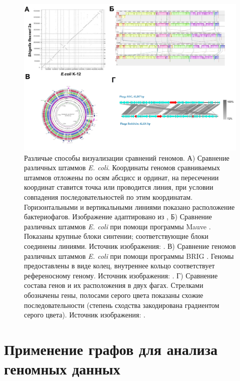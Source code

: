 \begin{figure}[!ht] 
  \center
  \includegraphics [width=\textwidth] {Dissertation/images/lit/comparisons.jpg}
  \caption{Различые способы визуализации сравнений геномов. А) Сравнение различных штаммов \textit{E. coli}. Координаты геномов сравниваемых штаммов отложены по осям абсцисс и ординат, на пересечении координат ставится точка или проводится линия, при условии совпадения последовательностей по этим координатам. Горизонтальными и вертикальными линиями показано расположение бактериофагов. Изображение адаптировано из \cite{brussow2004phages}, Б) Сравнение различных штаммов \textit{E. coli} при помощи программы Mauve \cite{darling2004mauve}. Показаны крупные блоки синтении; соответствующие блоки соединены линиями. Источник изображения: \cite{krol2019genome}. В) Сравнение геномов различных штаммов \textit{E. coli} при помощи программы BRIG \cite{alikhan2011blast}. Геномы предоставлены в виде колец, внутреннее кольцо соответствует референосному геному. Источник изображения: \cite{alikhan2011blast}. Г) Сравнение состава генов и их расположения в двух фагах. Стрелками обозначены гены, полосами серого цвета показаны схожие последовательности (степень сходства закодирована градиентом серого цвета). Источник изображения: \cite{liao2019characterization}.} 
  \label{img:comparison}  
\end{figure}


\section{Применение графов для анализа геномных данных}

